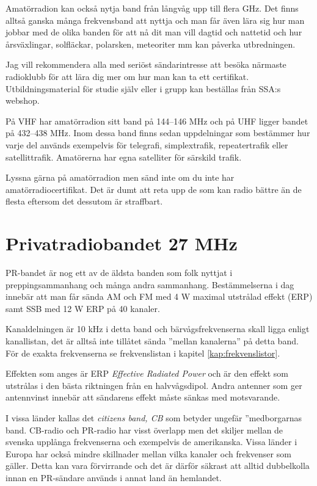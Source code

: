\documentclass[12ypt,swedish,a4paper]{report}
\begin{document}
Amatörradion kan också nytja band från långvåg upp till flera GHz. Det finns alltså ganska många frekvensband att nyttja och man får även lära sig hur man jobbar med de olika banden för att nå dit man vill dagtid och nattetid och hur årsväxlingar, solfläckar, polarsken, meteoriter mm kan påverka utbredningen.

Jag vill rekommendera alla med seriöst sändarintresse att besöka närmaste radioklubb för att lära dig mer om hur man kan ta ett certifikat. Utbildningsmaterial för studie själv eller i grupp kan beställas från SSA:s webshop.


På VHF har amatörradion sitt band på 144--146 MHz och på UHF ligger bandet på 432--438 MHz. Inom dessa band finns sedan uppdelningar som bestämmer hur varje del används exempelvis för telegrafi, simplextrafik, repeatertrafik eller satellittrafik. Amatörerna har egna satelliter för särskild trafik.

Lyssna gärna på amatörradion men sänd inte om du inte har amatörradiocertifikat. Det är dumt att reta upp de som kan radio bättre än de flesta eftersom det dessutom är straffbart.

\section{Privatradiobandet 27 MHz}

PR-bandet är nog ett av de äldsta banden som folk nyttjat i preppingsammanhang och många andra sammanhang. Bestämmelserna i dag innebär att man får sända AM och FM med 4 W maximal utstrålad effekt (ERP) samt SSB med 12 W ERP på 40 kanaler.

Kanaldelningen är 10 kHz i detta band och bärvågsfrekvenserna skall ligga enligt kanallistan, det är alltså inte tillåtet sända ''mellan kanalerna'' på detta band. För de exakta frekvenserna se frekvenslistan i kapitel \ref{kap:frekvenslistor}. 

Effekten som anges är ERP \textit{Effective Radiated Power} och är den effekt som utstrålas i den bästa riktningen från en halvvågsdipol. Andra antenner som ger antennvinst innebär att sändarens effekt måste sänkas med motsvarande.

I vissa länder kallas det \textit{citizens band, CB} som betyder ungefär ''medborgarnas band. CB-radio och PR-radio har visst överlapp men det skiljer mellan de svenska upplånga frekvenserna och exempelvis de amerikanska. Vissa länder i Europa har också mindre skillnader mellan vilka kanaler och frekvenser som gäller. Detta kan vara förvirrande och det är därför säkrast att alltid dubbelkolla innan en PR-sändare används i annat land än hemlandet. 
\end{document}
